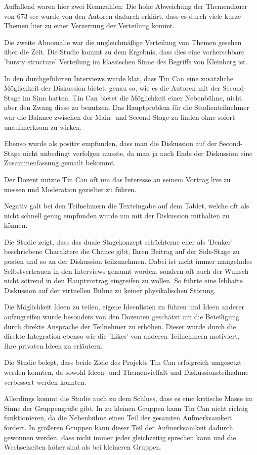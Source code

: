 Auffallend waren hier zwei Kennzahlen: Die hohe Abweichung der Themendauer von
673  sec wurde von den Autoren dadurch erklärt, dass es durch viele kurze Themen
hier zu einer Verzerrung der Verteilung kommt.

Die zweite Abnomalie war die ungleichmäßige Verteilung von Themen gesehen über
die Zeit. Die Studie kommt zu dem Ergebnis, dass dies eine vorhersehbare 'bursty
structure' Verteilung im klassischen Sinne des Begriffs von Kleinberg ist.

In den durchgeführten Interviews wurde klar, dass Tin Can eine zusätzliche
Möglichkeit der Diskussion bietet, genau so, wie es die Autoren mit der
Second-Stage im Sinn hatten. Tin Can bietet die Möglichkeit einer Nebenbühne,
nicht aber den Zwang diese zu benutzen. Das Hauptproblem für die
Studienteilnehmer war die Balance zwischen der Main- und Second-Stage zu finden
ohne sofort unaufmerksam zu wirken.

Ebenso wurde als positiv empfunden, dass man die Diskussion auf der Second-Stage
nicht unbedingt verfolgen musste, da man ja nach Ende der Diskussion eine
Zusammenfassung gemailt bekommt.

Der Dozent nutzte Tin Can oft um das Interesse an seinem Vortrag live zu messen
und Moderation gezielter zu führen.

Negativ galt bei den Teilnehmern die Texteingabe auf dem Tablet, welche oft als
nicht schnell genug empfunden wurde um mit der Diskussion mithalten zu können.

Die Studie zeigt, dass das duale Stagekonzept schüchterne eher als 'Denker'
beschriebene Charaktere die Chance gibt, Ihren Beitrag auf der Side-Stage zu
posten und so an der Diskussion teilzunehmen. Dabei ist nicht immer mangelndes
Selbstvertrauen in den Interviews genannt worden, sondern oft auch der Wunsch
nicht sötrend in den Hauptvortrag eingreifen zu wollen. So führte eine lebhafte
Diskussion auf der virtuellen Bühne zu keiner physikalischen Störung.

Die Möglichkeit Ideen zu teilen, eigene Ideenlisten zu führen und Ideen anderer
aufzugreifen wurde besonders von den Dozenten geschätzt um die Beteiligung durch
direkte Ansprache der Teilnehmer zu erhöhen. Dieser wurde durch die direkte
Integration ebenso wie die 'Likes' von anderen Teilnehmern motiviert, Ihre
privaten Ideen zu erläutern.

Die Studie belegt, dass beide Ziele des Projekts Tin Can erfolgreich umgesetzt
werden konnten, da sowohl Ideen- und Themenvielfalt und Diskussionsteilnahme
verbessert werden konnten.

Allerdings kommt die Studie auch zu dem Schluss, dass es eine kritische Masse im
Sinne der Gruppengröße gibt. In zu kleinen Gruppen kann Tin Can nicht richtig
funktionieren, da die Nebenbühne einen Teil der gesamten Aufmerksamkeit fordert.
In größeren Gruppen kann dieser Teil der Aufmerksamkeit dadurch gewonnen werden,
dass nicht immer jeder gleichzeitig sprechen kann und die Wechselzeiten höher
sind als bei kleineren Gruppen.





